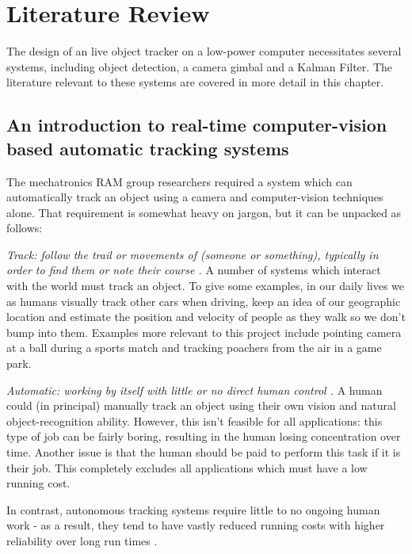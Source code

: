 \chapter{Literature Review}

The design of an live object tracker on a low-power computer necessitates several systems, including object detection, a camera gimbal and a Kalman Filter. The literature relevant to these systems are covered in more detail in this chapter.

\section{An introduction to real-time computer-vision based automatic tracking systems}\label{sec:compare_cv_techniques}
The mechatronics RAM group researchers required a system which can automatically track an object using a camera and computer-vision techniques alone. That requirement is somewhat heavy on jargon, but it can be unpacked as follows:

\textit{Track: follow the trail or movements of (someone or something), typically in order to find them or note their course \cite{website:definition_track}.}
%
A number of systems which interact with the world must track an object. To give some examples, in our daily lives we as humans visually track other cars when driving, keep an idea of our geographic location and estimate the position and velocity of people as they walk so we don't bump into them. Examples more relevant to this project include pointing camera at a ball during a sports match and tracking poachers from the air in a game park.



\textit{Automatic: working by itself with little or no direct human control \cite{website:definition_automation}.}
%
A human could (in principal) manually track an object using their own vision and natural object-recognition ability. However, this isn't feasible for all applications: this type of job can be fairly boring, resulting in the human losing concentration over time. Another issue is that the human should be paid to perform this task if it is their job. This completely excludes all applications which must have a low running cost.

In contrast, autonomous tracking systems require little to no ongoing human work - as a result, they tend to have vastly reduced running costs with higher reliability over long run times \cite{website:BCG_automation}.



